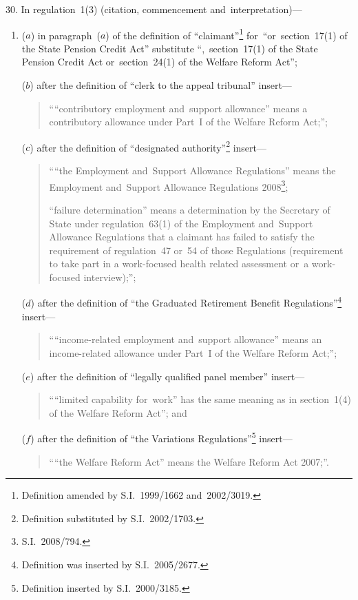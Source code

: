 \documentclass[12pt,a4paper]{article}
\begin{document}
30.  In regulation~1(3) (citation, commencement and~interpretation)—
\begin{enumerate}\item[]
($a$) in paragraph~($a$)  of the definition of “claimant”\footnote{Definition amended by S.I.~1999/1662 and~2002/3019.} for~“or~section~17(1) of the State Pension Credit Act” substitute “,~section~17(1) of the State Pension Credit Act or~section~24(1) of the Welfare Reform Act”;

($b$) after the definition of “clerk to the appeal tribunal” insert—
\begin{quotation}
““contributory employment and~support allowance” means a contributory allowance under Part~I of the Welfare Reform Act;”;
\end{quotation}

($c$) after the definition of “designated authority”\footnote{Definition substituted by S.I.~2002/1703.} insert—
\begin{quotation}
““the Employment and~Support Allowance Regulations” means the Employment and~Support Allowance Regulations 2008\footnote{S.I.~2008/794.};

“failure determination” means a determination by the Secretary of State under regulation~63(1) of the Employment and~Support Allowance Regulations that a claimant has failed to satisfy the requirement of regulation~47 or~54 of those Regulations (requirement to take part in a work-focused health related assessment or~a work-focused interview);”;
\end{quotation}

($d$) after the definition of “the Graduated Retirement Benefit Regulations”\footnote{Definition was inserted by S.I.~2005/2677.} insert—
\begin{quotation}\sloppy
““income-related employment and~support allowance” means an income-related allowance under Part~I of the Welfare Reform Act;”;
\end{quotation}

($e$) after the definition of “legally qualified panel member” insert—
\begin{quotation}
““limited capability for~work” has the same meaning as in section~1(4) of the Welfare Reform Act”; and
\end{quotation}

($f$) after the definition of “the Variations Regulations”\footnote{Definition inserted by S.I.~2000/3185.} insert—
\begin{quotation}
““the Welfare Reform Act” means the Welfare Reform Act 2007;”.
\end{quotation}
\end{enumerate}
\end{document}
